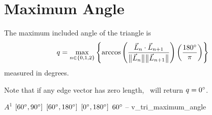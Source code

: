 \section{Maximum Angle\label{s:tri-max-angle}}

The maximum included angle of the triangle is
\[
  q =
    \max_{n\in\{0,1,2\}}\left\{\arccos{\left(
      \frac{\vec L_n\cdot\vec L_{n+1}}{\big\lVert{\vec L_n}\big\rVert\big\lVert{\vec L_{n+1}}\big\rVert}
    \right)}\left(\frac{180^{\circ}}{\pi}\right)\right\}
\]
measured in degrees.

Note that if any edge vector has zero length, \verd\ will return $q = 0^{\circ}$.

%
{$A^1$}%
{$[60^{\circ},90^{\circ}]$}%
{$[60^{\circ},180^{\circ}]$}%
{$[0^{\circ},180^{\circ}]$}%
{$60^{\circ}$}%
{--}%
{v\_tri\_maximum\_angle}%

